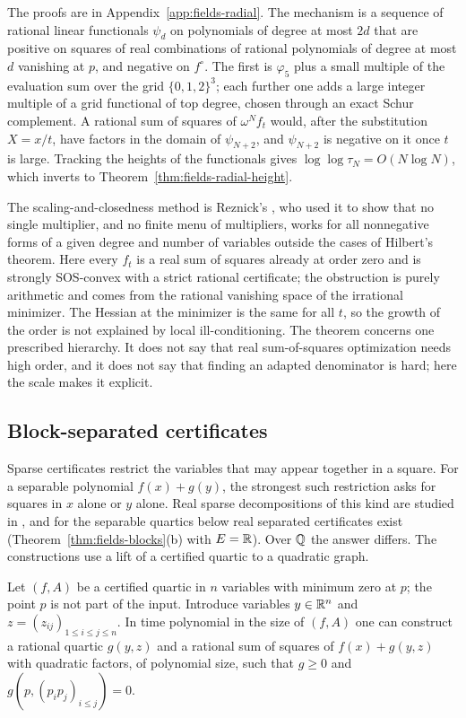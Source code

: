 The proofs are in Appendix~\ref{app:fields-radial}. The mechanism is a
sequence of rational linear functionals $\psi_d$ on polynomials of degree at
most $2d$ that are positive on squares of real combinations of rational
polynomials of degree at most $d$ vanishing at $p$, and negative on
$f^\circ$. The first is $\varphi_5$ plus a small multiple of the evaluation
sum over the grid $\{0,1,2\}^3$; each further one adds a large integer
multiple of a grid functional of top degree, chosen through an exact Schur
complement. A rational sum of squares of $\omega^Nf_t$ would, after the
substitution $X=x/t$, have factors in the domain of $\psi_{N+2}$, and
$\psi_{N+2}$ is negative on it once $t$ is large. Tracking the heights of the
functionals gives $\log\log\tau_N=O(N\log N)$, which inverts to
Theorem~\ref{thm:fields-radial-height}.

The scaling-and-closedness method is Reznick's
\cite[Theorem~1 and Corollary~2]{Reznick2005}, who used it to show that no
single multiplier, and no finite menu of multipliers, works for all
nonnegative forms of a given degree and number of variables outside the
cases of Hilbert's theorem. Here every $f_t$ is a real sum of squares
already at order zero and is strongly SOS-convex with a strict rational
certificate; the obstruction
is purely arithmetic and comes from the rational vanishing space of the
irrational minimizer. The Hessian at the minimizer is the same for all $t$,
so the growth of the order is not explained by local ill-conditioning. The
theorem concerns one prescribed hierarchy. It does not say that real
sum-of-squares optimization needs high order, and it does not say that finding
an adapted denominator is hard; here the scale makes it explicit.

\subsection{Block-separated certificates}
\label{sec:fields-blocks}

Sparse certificates restrict the variables that may appear together in a
square. For a separable polynomial $f(x)+g(y)$, the strongest such
restriction asks for squares in $x$ alone or $y$ alone. Real sparse
decompositions of this kind are studied in \cite{KojimaKimWaki2005}, and for
the separable quartics below real separated certificates exist
(Theorem~\ref{thm:fields-blocks}(b) with $E=\mathbb R$). Over $\mathbb Q$ the answer
differs. The constructions use a lift of a certified quartic to a quadratic
graph.

\begin{lemma}
\label{lem:fields-lift}
Let $(f,A)$ be a certified quartic in $n$ variables with minimum zero at $p$;
the point $p$ is not part of the input. Introduce variables $y\in\mathbb R^n$ and
$z=(z_{ij})_{1\le i\le j\le n}$. In time polynomial in the size of $(f,A)$ one
can construct a rational quartic $g(y,z)$ and a rational sum of squares of
$f(x)+g(y,z)$ with quadratic factors, of polynomial size, such that $g\ge0$
and $g(p,(p_ip_j)_{i\le j})=0$.
\end{lemma}

